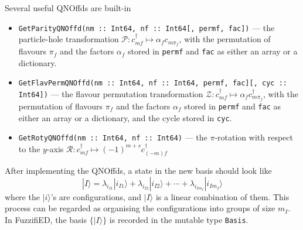 \documentclass{timesjhep}
\begin{document}
Several useful QNOffds are built-in
\begin{itemize}
    \item \lstinline|GetParityQNOffd(nm :: Int64, nf :: Int64[, permf, fac])| --- the particle-hole transformation $\mathcal{P}:c^\dagger_{mf}\mapsto\alpha_fc_{m\pi_f}$, with the permutation of flavours $\pi_f$ and the factors $\alpha_f$ stored in \lstinline|permf| and \lstinline|fac| as either an array or a dictionary. 
    \item \lstinline|GetFlavPermQNOffd(nm :: Int64, nf :: Int64, permf, fac][, cyc :: Int64])| --- the flavour permutation transformation $\mathcal{Z}:c^\dagger_{mf}\mapsto\alpha_fc_{m\pi_f}^\dagger$, with the permutation of flavours $\pi_f$ and the factors $\alpha_f$ stored in \lstinline|permf| and \lstinline|fac| as either an array or a dictionary, and the cycle stored in \lstinline|cyc|. 
    \item \lstinline|GetRotyQNOffd(nm :: Int64, nf :: Int64)| --- the $\pi$-rotation with respect to the $y$-axis $\mathcal{R}:c^\dagger_{mf}\mapsto(-1)^{m+s}c_{(-m)f}^\dagger$
\end{itemize}

After implementing the QNOffds, a state in the new basis should look like 
\begin{equation}
    |I\rangle=\lambda_{i_{I1}}|i_{I1}\rangle+\lambda_{i_{I2}}|i_{I2}\rangle+\cdots+\lambda_{i_{Im_I}}|i_{Im_I}\rangle
\end{equation}
where the $|i\rangle$'s are configurations, and $|I\rangle$ is a linear combination of them. This process can be regarded as organising the configurations into groups of size $m_I$. In FuzzifiED, the basis $\{|I\rangle\}$ is recorded in the mutable type \lstinline|Basis|. 
\end{document}

